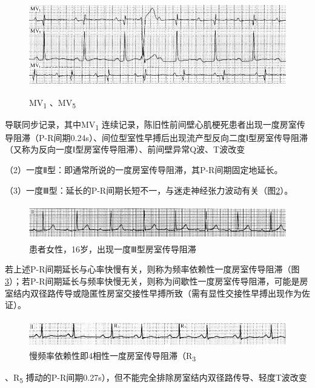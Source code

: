 \begin{figure}[!htbp]
 \centering
 \includegraphics[width=5.58333in,height=1.70833in]{./images/Image00331.jpg}
 \captionsetup{justification=centering}
 \caption{MV\textsubscript{1} 、MV\textsubscript{5}}
 \label{fig20-2}
  \end{figure} 
导联同步记录，其中MV\textsubscript{1}
连续记录，陈旧性前间壁心肌梗死患者出现一度房室传导阻滞（P-R间期0.24s）、间位型室性早搏后出现流产型反向二度Ⅰ型房室传导阻滞（又称为反向一度Ⅰ型房室传导阻滞）、前间壁异常Q波、T波改变

（2）一度Ⅱ型：即通常所说的一度房室传导阻滞，其P-R间期固定地延长。

（3）一度Ⅲ型：延长的P-R间期长短不一，与迷走神经张力波动有关（图\ref{fig20-3}）。

\begin{figure}[!htbp]
 \centering
 \includegraphics[width=5.58333in,height=0.61458in]{./images/Image00332.jpg}
 \captionsetup{justification=centering}
 \caption{患者女性，16岁，出现一度Ⅲ型房室传导阻滞}
 \label{fig20-3}
  \end{figure} 

若上述P-R间期延长与心率快慢有关，则称为频率依赖性一度房室传导阻滞（图\ref{fig20-4}）；若P-R间期延长与频率快慢无关，则称为间歇性一度房室传导阻滞，可能是房室结内双径路传导或隐匿性房室交接性早搏所致（需有显性交接性早搏出现作为佐证）。

\begin{figure}[!htbp]
 \centering
 \includegraphics[width=5.58333in,height=0.47917in]{./images/Image00333.jpg}
 \captionsetup{justification=centering}
 \caption{慢频率依赖性即4相性一度房室传导阻滞（R\textsubscript{3}}
 \label{fig20-4}
  \end{figure} 
、R\textsubscript{5}
搏动的P-R间期0.27s），但不能完全排除房室结内双径路传导、轻度T波改变

